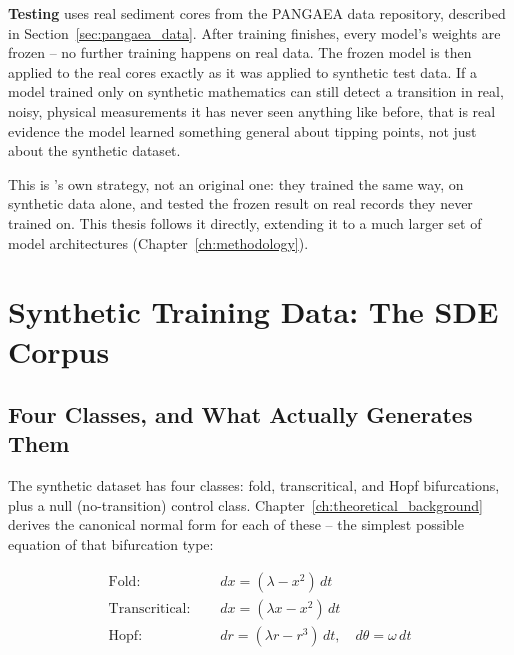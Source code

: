 \textbf{Testing} uses real sediment cores from the PANGAEA data repository, described in Section~\ref{sec:pangaea_data}. After training finishes, every model's weights are frozen -- no further training happens on real data. The frozen model is then applied to the real cores exactly as it was applied to synthetic test data. If a model trained only on synthetic mathematics can still detect a transition in real, noisy, physical measurements it has never seen anything like before, that is real evidence the model learned something general about tipping points, not just about the synthetic dataset.

This is \citet{bury2021}'s own strategy, not an original one: they trained the same way, on synthetic data alone, and tested the frozen result on real records they never trained on. This thesis follows it directly, extending it to a much larger set of model architectures (Chapter~\ref{ch:methodology}).

\section{Synthetic Training Data: The SDE Corpus}
\label{sec:sde_corpus}

\subsection{Four Classes, and What Actually Generates Them}

The synthetic dataset has four classes: fold, transcritical, and Hopf bifurcations, plus a null (no-transition) control class. Chapter~\ref{ch:theoretical_background} derives the canonical normal form for each of these -- the simplest possible equation of that bifurcation type:

\begin{align}
    \text{Fold: }\quad          & dx = (\lambda - x^2)\, dt \\
    \text{Transcritical: }\quad & dx = (\lambda x - x^2)\, dt \\
    \text{Hopf: }\quad          & dr = (\lambda r - r^3)\, dt, \quad d\theta = \omega\, dt
\end{align}

